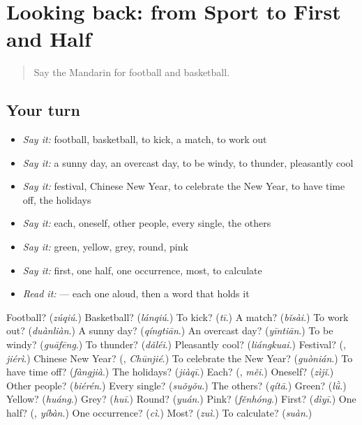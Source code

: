 \section[(dialogue)]{Looking back: from Sport to First and Half}

\label{lesson:ZH-R140-review-135-140}



\begin{quote}
Say the Mandarin for football and basketball.
\end{quote}

\subsection*{Your turn}
\begin{itemize}
\raggedright
  \item \emph{Say it:} football, basketball, to kick, a match, to work out
  \item \emph{Say it:} a sunny day, an overcast day, to be windy, to thunder, pleasantly cool
  \item \emph{Say it:} festival, Chinese New Year, to celebrate the New Year, to have time off, the holidays
  \item \emph{Say it:} each, oneself, other people, every single, the others
  \item \emph{Say it:} green, yellow, grey, round, pink
  \item \emph{Say it:} first, one half, one occurrence, most, to calculate
  \item \emph{Read it:}    — each one aloud, then a word that holds it
\end{itemize}

\begin{tcolorbox}[breakable,colback=teal!4,colframe=teal!35!black,title={Before you move on}]
Football? (\emph{zúqiú}.) Basketball? (\emph{lánqiú}.) To kick? (\emph{tī}.) A match? (\emph{bǐsài}.) To work out? (\emph{duànliàn}.) A sunny day? (\emph{qíngtiān}.) An overcast day? (\emph{yīntiān}.) To be windy? (\emph{guāfēng}.) To thunder? (\emph{dǎléi}.) Pleasantly cool? (\emph{liángkuai}.) Festival? (\textbf{}, \emph{jiérì}.) Chinese New Year? (\textbf{}, \emph{Chūnjié}.) To celebrate the New Year? (\emph{guònián}.) To have time off? (\emph{fàngjià}.) The holidays? (\emph{jiàqī}.) Each? (\textbf{}, \emph{měi}.) Oneself? (\emph{zìjǐ}.) Other people? (\emph{biérén}.) Every single? (\emph{suǒyǒu}.) The others? (\emph{qítā}.) Green? (\emph{lǜ}.) Yellow? (\emph{huáng}.) Grey? (\emph{huī}.) Round? (\emph{yuán}.) Pink? (\emph{fěnhóng}.) First? (\emph{dìyī}.) One half? (\textbf{}, \emph{yíbàn}.) One occurrence? (\emph{cì}.) Most? (\emph{zuì}.) To calculate? (\emph{suàn}.)
\end{tcolorbox}
